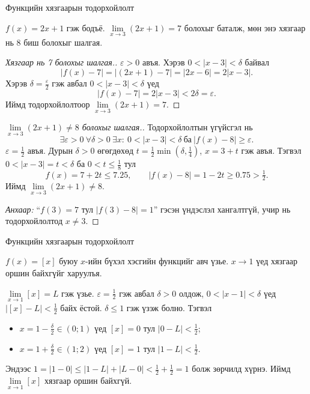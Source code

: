 \begin{frame}[allowframebreaks]{Функцийн хязгаарын тодорхойлолт}
\begin{example}
$f(x)=2x+1$ гэж бодъё. $\lim\limits_{x\to 3}(2x+1)=7$ болохыг баталж, мөн энэ хязгаар нь 8 биш болохыг шалгая.

\begin{proof}[Хязгаар нь 7 болохыг шалгая.]
$\varepsilon>0$ авъя. Хэрэв $0<|x-3|<\delta$ байвал
\[
|f(x)-7| = |(2x+1)-7| = |2x-6| = 2|x-3|.
\]
Хэрэв $\delta=\tfrac{\varepsilon}{2}$ гэж авбал $0<|x-3|<\delta$ үед
\[
|f(x)-7| = 2|x-3| < 2\delta = \varepsilon.
\]
Иймд тодорхойлолтоор $\lim\limits_{x\to 3}(2x+1)=7$.
\end{proof}

\begin{proof}[$\lim\limits_{x\to 3}(2x+1)\neq 8$ болохыг шалгая.]
Тодорхойлолтын үгүйсгэл нь
\[
\exists\varepsilon>0\ \forall\delta>0\ \exists x:\ 0<|x-3|<\delta\ \text{ба}\ |f(x)-8|\ge\varepsilon.
\]
$\varepsilon=\tfrac12$ авъя. Дурын $\delta>0$ өгөгдөхөд $t=\tfrac12\min\left(\delta,\tfrac14\right)$,
$x=3+t$ гэж авъя. Тэгвэл $0<|x-3|=t<\delta$ ба $0<t\le\tfrac18$ тул
\[
f(x)=7+2t\le7.25,\qquad |f(x)-8|=1-2t\ge0.75>\tfrac12.
\]
Иймд $\lim\limits_{x\to 3}(2x+1)\neq 8$.

\textit{Анхаар:} ``$f(3)=7$ тул $|f(3)-8|=1$'' гэсэн үндэслэл хангалтгүй, учир нь тодорхойлолтод $x\ne3$.
\end{proof}
\end{example}
\end{frame}

\begin{frame}[allowframebreaks]{Функцийн хязгаарын тодорхойлолт}
\begin{example}
$f(x) = [x]$ буюу $x$-ийн бүхэл хэсгийн функцийг авч үзье. $x \to 1$ үед хязгаар оршин байхгүйг харуулъя.

$\lim\limits_{x\to 1}[x]=L$ гэж үзье. $\varepsilon=\tfrac12$ гэж авбал $\delta>0$ олдож, $0<|x-1|<\delta$ үед
$|[x]-L|<\tfrac12$ байх ёстой. $\delta\le1$ гэж үзэж болно. Тэгвэл
\begin{itemize}
\item $x=1-\tfrac\delta2\in(0;1)$ үед $[x]=0$ тул $|0-L|<\tfrac12$;
\item $x=1+\tfrac\delta2\in(1;2)$ үед $[x]=1$ тул $|1-L|<\tfrac12$.
\end{itemize}
Эндээс $1=|1-0|\le|1-L|+|L-0|<\tfrac12+\tfrac12=1$ болж зөрчилд хүрнэ.
Иймд $\lim\limits_{x\to 1}[x]$ хязгаар оршин байхгүй.
\end{example}
\end{frame}

